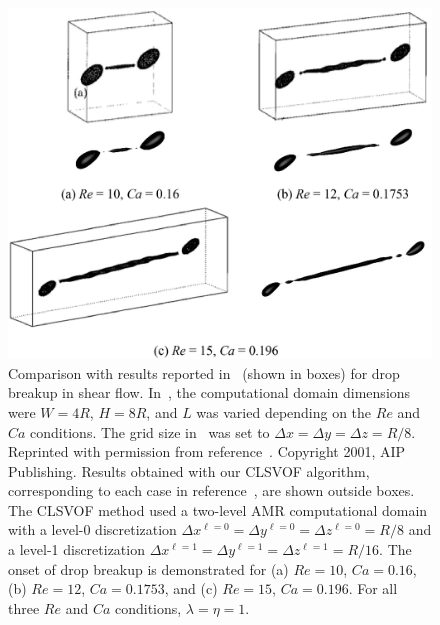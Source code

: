 \documentclass{elsarticle}
\begin{document}
\begin{figure}[h!]
  \centering
  \includegraphics[scale=0.5]{Figure/2-DropBreakComparison}
  \caption{Comparison with results reported 
	in~\citet{RenCri01-2} 
	(shown in boxes) 
        for drop breakup in shear flow.  
	In~\citet{RenCri01-2},
	the computational domain
        dimensions were 
	$W=4R$, $H=8R$, and $L$ was varied depending 
        on the $Re$ and $Ca$ conditions.  The
	grid size 
	in~\citet{RenCri01-2} 
	was set to 
        $\Delta x=\Delta y=\Delta z=R/8$.  
	Reprinted with permission from 
        reference~\citet{RenCri01-2}. 
	Copyright 2001, AIP Publishing. 
	Results
        obtained with our CLSVOF algorithm, corresponding to each case in
        reference~\citet{RenCri01-2}, are shown outside boxes.  The
        CLSVOF method used a two-level AMR computational domain 
        with a level-0 discretization 
	$\Delta x^{\ell=0} = \Delta y^{\ell=0} = \Delta z^{\ell=0} = R/8$ 
	and a level-1 discretization
        $\Delta x^{\ell=1} = \Delta y^{\ell=1} = \Delta z^{\ell=1} = R/16$. 
        The onset of drop breakup is demonstrated for (a) $Re=10$,
        $Ca=0.16$, (b) $Re=12$, $Ca=0.1753$, and (c) $Re=15$, $Ca=0.196$.
        For all three $Re$ and $Ca$ conditions, $\lambda = \eta = 1$.}
  \label{fig:DropBreakComp}
\end{figure}
%
\end{document}
